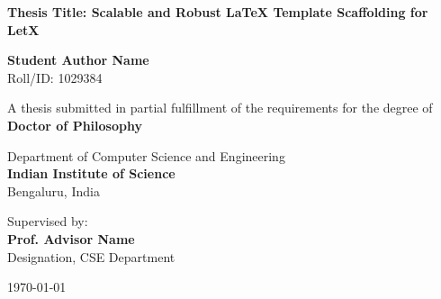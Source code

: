 \begin{titlepage}
\begin{center}
    \vspace*{1cm}
    
    
    \vspace{1.5cm}
    
    {\huge \bfseries \color{primary} Thesis Title: Scalable and Robust LaTeX Template Scaffolding for LetX}
    
    \vspace{1.5cm}
    
    {\Large \bfseries Student Author Name} \\
    \vspace{0.2cm}
    {Roll/ID: 1029384}
    
    \vspace{1.5cm}
    
    {A thesis submitted in partial fulfillment of the requirements for the degree of} \\
    \vspace{0.3cm}
    {\large \bfseries \color{secondary} Doctor of Philosophy}
    
    \vspace{1.5cm}
    
    {Department of Computer Science and Engineering} \\
    \vspace{0.2cm}
    {\large \bfseries \color{primary} Indian Institute of Science} \\
    \vspace{0.1cm}
    {Bengaluru, India}
    
    \vfill
    
    {Supervised by:} \\
    {\large \bfseries Prof. Advisor Name} \\
    {Designation, CSE Department}
    
    \vspace{1cm}
    
    {\large \today}
    
\end{center}
\end{titlepage}
